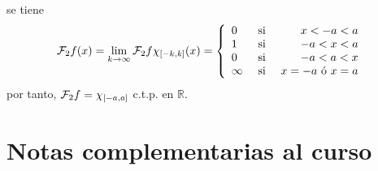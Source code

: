 \documentclass[12pt]{report}
\theoremstyle{largebreak}
\newcommand{\fou}[1]{\ensuremath{\mathcal{F}#1}}
\begin{document}
\begin{exa}
        se tiene
        \begin{equation*}
            \fou_2{f}(x)=\lim_{ k\rightarrow\infty}\fou_2{f\chi_{[-k,k]}}(x)=\left\{
                \begin{array}{lcr}
                    0 &\textup{ si } & x <-a<a\\
                    1 & \textup{ si } & -a<x<a\\
                    0 & \textup{ si } & -a<a<x\\
                    \infty & \textup{ si } & x=-a \textup{ ó }x=a\\
                \end{array}
            \right.
        \end{equation*}
        por tanto, $\fou_2{f}=\chi_{[-a,a]}$ c.t.p. en $\mathbb{R}$.
    \end{exa}

    \section*{Notas complementarias al curso}

    
\end{document}
